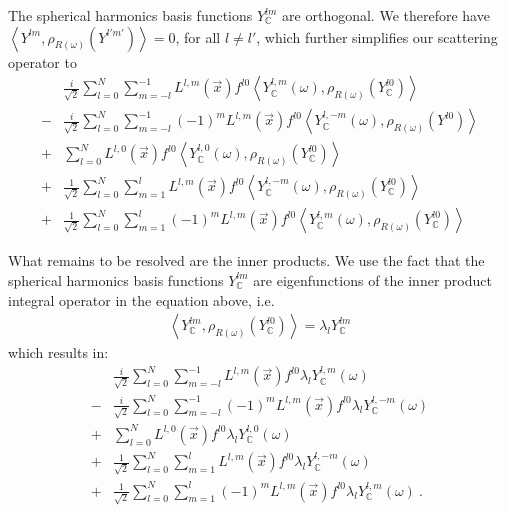 \documentclass{egpubl}
\newcommand{\SHBC}{Y_{\mathbb{C}}} %
\begin{document}
The spherical harmonics basis functions $\SHBC^{lm}$ are orthogonal. We therefore have $\left < Y^{lm}, \rho_{R(\omega)}\left(Y^{l'm'}\right) \right > = 0$, for all $l\ne l'$, which further simplifies our scattering operator to
\begin{align}
&
\frac{i}{\sqrt{2}}
\sum_{l=0}^{N}{
\sum_{m=-l}^{-1}{
L^{{l,m}}\left (\vec{x} \right )
f^{l0}
\left<
\SHBC^{l, m}(\omega )
, \rho_{R\left(\omega\right)}
\left(
\SHBC^{l0}
\right)
\right>
}
}
\\
-
&
\frac{i}{\sqrt{2}}
\sum_{l=0}^{N}{
\sum_{m=-l}^{-1}{
\left({-1}\right)^{m}
L^{{l,m}}\left (\vec{x} \right )
f^{l0}
\left<
\SHBC^{l, -m}(\omega )
, \rho_{R\left(\omega\right)}
\left(
Y^{l0}
\right)
\right>
}
}
\\
+
&
\sum_{l=0}^{N}{
L^{{l,0}}\left (\vec{x} \right )
f^{l0}
\left<
\SHBC^{l, 0}(\omega )
, \rho_{R\left(\omega\right)}
\left(
\SHBC^{l0}
\right)
\right>
}
\\
+
&
\frac{1}{\sqrt{2}}
\sum_{l=0}^{N}{
\sum_{m=1}^{l}{
L^{{l,m}}\left (\vec{x} \right )
f^{l0}
\left<
\SHBC^{l, -m}(\omega )
, \rho_{R\left(\omega\right)}
\left(
\SHBC^{l0}
\right)
\right>
}
}
\\
+
&
\frac{1}{\sqrt{2}}
\sum_{l=0}^{N}{
\sum_{m=1}^{l}{
\left({-1}\right)^{m}
L^{{l,m}}\left (\vec{x} \right )
f^{l0}
\left<
\SHBC^{l, m}(\omega )
, \rho_{R\left(\omega\right)}
\left(
\SHBC^{l0}
\right)
\right>
}
}
\end{align}

What remains to be resolved are the inner products. We use the fact that the spherical harmonics basis functions $ \SHBC^{lm}$ are eigenfunctions of the inner product integral operator in the equation above, i.e.
\begin{align}
\left < \SHBC^{lm}, \rho_{R(\omega)}\left ( \SHBC^{l0} \right )\right > = \lambda_l \SHBC^{lm}
\end{align}
which results in:
\begin{align}
&
\frac{i}{\sqrt{2}}
\sum_{l=0}^{N}{
\sum_{m=-l}^{-1}{
L^{{l,m}}\left (\vec{x} \right )
f^{l0}
\lambda_l
\SHBC^{l, m}(\omega )
}
}
\\
-
&
\frac{i}{\sqrt{2}}
\sum_{l=0}^{N}{
\sum_{m=-l}^{-1}{
\left({-1}\right)^{m}
L^{{l,m}}\left (\vec{x} \right )
f^{l0}
\lambda_l
\SHBC^{l, -m}(\omega )
}
}
\\
+
&
\sum_{l=0}^{N}{
L^{{l,0}}\left (\vec{x} \right )
f^{l0}
\lambda_l
\SHBC^{l, 0}(\omega )
}
\\
+
&
\frac{1}{\sqrt{2}}
\sum_{l=0}^{N}{
\sum_{m=1}^{l}{
L^{{l,m}}\left (\vec{x} \right )
f^{l0}
\lambda_l
\SHBC^{l, -m}(\omega )
}
}
\\
+
&
\frac{1}{\sqrt{2}}
\sum_{l=0}^{N}{
\sum_{m=1}^{l}{
\left({-1}\right)^{m}
L^{{l,m}}\left (\vec{x} \right )
f^{l0}
\lambda_l
\SHBC^{l, m}(\omega )
}
} \ .
\end{align}
\end{document}
